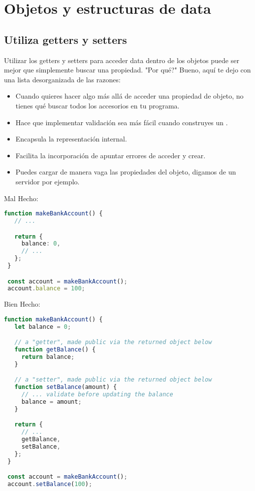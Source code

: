 \section{Objetos y estructuras de data}

\subsection*{Utiliza getters y setters}

Utilizar los getters y setters para acceder data dentro de los objetos puede ser mejor que simplemente buscar una propiedad. "Por qué?" Bueno, aquí te dejo con una lista desorganizada de las razones:

\begin{itemize}
  \item Cuando quieres hacer algo más allá de acceder una propiedad de objeto, no tienes qué buscar todos los accesorios en tu programa.
  \item Hace que implementar validación sea más fácil cuando construyes un .
  \item Encapsula la representación internal.
  \item Facilita la incorporación de apuntar errores de acceder y crear.
  \item Puedes cargar de manera vaga las propiedades del objeto, digamos de un servidor por ejemplo.
\end{itemize}

Mal Hecho:
\begin{lstlisting}[language=TypeScript, style=badstyle]
 function makeBankAccount() {
   // ...

   return {
     balance: 0,
     // ...
   };
 }

 const account = makeBankAccount();
 account.balance = 100;
\end{lstlisting}
\vspace{0.5cm} %

Bien Hecho:
\begin{lstlisting}[language=TypeScript, style=goodstyle]
 function makeBankAccount() {
   let balance = 0;

   // a "getter", made public via the returned object below
   function getBalance() {
     return balance;
   }

   // a "setter", made public via the returned object below
   function setBalance(amount) {
     // ... validate before updating the balance
     balance = amount;
   }

   return {
     // ...
     getBalance,
     setBalance,
   };
 }

 const account = makeBankAccount();
 account.setBalance(100);
\end{lstlisting}
\newpage

